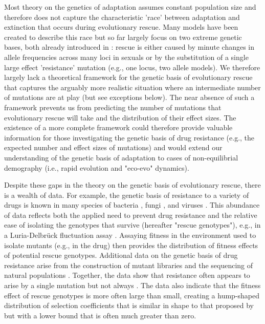 \documentclass[9pt,twocolumn,twoside,lineno]{gsajnl}
\begin{document}
Most theory on the genetics of adaptation \citep[reviewed in][]{Orr2005} assumes constant population size and therefore does not capture the characteristic 'race' between adaptation and extinction that occurs during evolutionary rescue. 
Many models have been created to describe this race \citep[reviewed in][]{Alexander2014} but so far largely focus on two extreme genetic bases, both already introduced in \cite{Gomulkiewicz1995}: 
rescue is either caused by minute changes in allele frequencies across many loci in sexuals \citep[i.e., the infinitesimal model;][]{Fisher1918} or by the substitution of a single large effect 'resistance' mutation (e.g., one locus, two allele models).
We therefore largely lack a theoretical framework for the genetic basis of evolutionary rescue that captures the arguably more realistic situation where an intermediate number of mutations are at play (but see exceptions below). 
The near absence of such a framework prevents us from predicting the number of mutations that evolutionary rescue will take and the distribution of their effect sizes.
The existence of a more complete framework could therefore provide valuable information for those investigating the genetic basis of drug resistance (e.g., the expected number and effect sizes of mutations) and would extend our understanding of the genetic basis of adaptation to cases of non-equilibrial demography (i.e., rapid evolution and "eco-evo" dynamics).

Despite these gaps in the theory on the genetic basis of evolutionary rescue, there is a wealth of data.
For example, the genetic basis of resistance to a variety of drugs is known in many species of bacteria \citep[reviewed in][]{MacLean2010}, fungi \citep[reviewed in][]{Robbins2017}, and viruses \citep[reviewed in][]{Yilmaz2016}.
This abundance of data reflects both the applied need to prevent drug resistance and the relative ease of isolating the genotypes that survive (hereafter "rescue genotypes"), e.g., in a Luria-Delbr\"{u}ck fluctuation assay \citep[reviewed in][]{Bataillon2014}.
Assaying fitness in the environment used to isolate mutants (e.g., in the drug) then provides the distribution of fitness effects of potential rescue genotypes. %
Additional data on the genetic basis of drug resistance arise from the construction of mutant libraries \citep[e.g.,][]{Weinreich2006} and the sequencing of natural populations \citep[e.g.,][]{Pennings2014}.
Together, the data show that resistance often appears to arise by a single mutation \citep[e.g.,][]{MacLean2009,Lindsey2013,Gerstein2012} but not always \citep[e.g.,][]{Bataillon2011,Pennings2014,Gerstein2015,williams2019drug}.
The data also indicate that the fitness effect of rescue genotypes is more often large than small, creating a hump-shaped distribution of selection coefficients \citep[e.g.,][]{Kassen2006,MacLean2009,Gerstein2012,Lindsey2013,Gerstein2015} that is similar in shape to that proposed by \cite{Kimura1983} \citep[see][for more discussion]{Orr1998} but with a lower bound that is often much greater than zero.
\end{document}
